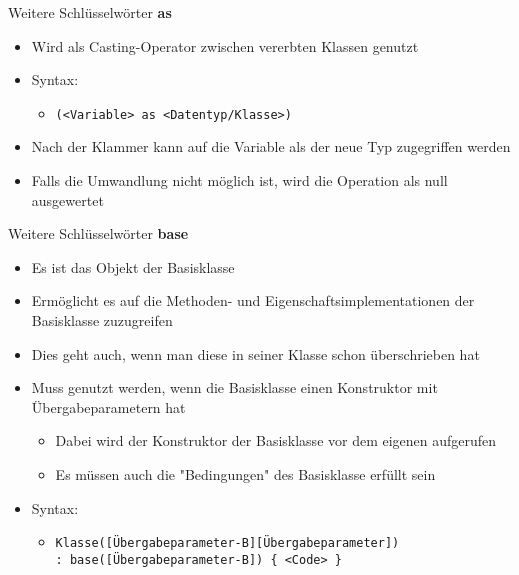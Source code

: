 \begin{frame}{Weitere Schlüsselwörter}
	\textbf{as}\\
	\begin{itemize}
		\item Wird als Casting-Operator zwischen vererbten Klassen genutzt
		\item Syntax:
		\begin{itemize}
			\item \texttt{(\alert{<Variable>} as \alert{<Datentyp/Klasse>})}
		\end{itemize}
		\item Nach der Klammer kann auf die Variable als der neue Typ zugegriffen werden
		\item Falls die Umwandlung nicht möglich ist, wird die Operation als \alert{null} ausgewertet
	\end{itemize}	
	
\end{frame}

\begin{frame}{Weitere Schlüsselwörter}
	\textbf{base}\\
	\begin{itemize}
		\item Es ist das Objekt der Basisklasse
		\item Ermöglicht es auf die Methoden- und Eigenschaftsimplementationen der Basisklasse zuzugreifen
		\item Dies geht auch, wenn man diese in seiner Klasse schon überschrieben hat
	\end{itemize}
	\begin{itemize}
		\item Muss genutzt werden, wenn die Basisklasse einen Konstruktor mit Übergabeparametern hat
		\begin{itemize}
			\item Dabei wird der Konstruktor der Basisklasse vor dem eigenen aufgerufen
			\item Es müssen auch die "Bedingungen" des Basisklasse erfüllt sein
		\end{itemize}
		\item Syntax:
		\begin{itemize}
			\item \texttt{\alert{Klasse}(\alert{[Übergabeparameter-B][Übergabeparameter]})\\ : base(\alert{[Übergabeparameter-B]}) \{ \alert{<Code>} \}}
		\end{itemize}
	\end{itemize}
\end{frame}

